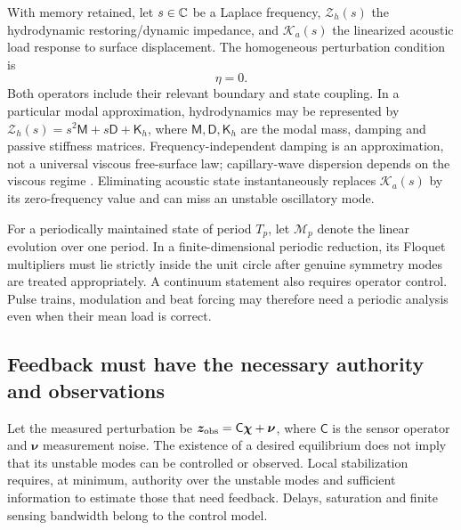 With memory retained, let $s\in\mathbb C$ be a Laplace frequency,
$\mathcal Z_h(s)$ the hydrodynamic restoring/dynamic impedance, and
$\mathcal K_a(s)$ the linearized acoustic load response to surface displacement.
The homogeneous perturbation condition is
\begin{equation}
 [\mathcal Z_h(s)-\mathcal K_a(s)]\eta=0.
 \label{eq:memory-stability}
\end{equation}
Both operators include their relevant boundary and state coupling. In a
particular modal approximation, hydrodynamics may be represented by
$\mathcal Z_h(s)=s^2\mathsf M+s\mathsf D+\mathsf K_h$, where
$\mathsf M,\mathsf D,\mathsf K_h$ are the modal mass, damping and passive
stiffness matrices. Frequency-independent damping is an approximation, not a
universal viscous free-surface law; capillary-wave dispersion depends on the
viscous regime \cite{denner2016}. Eliminating acoustic state instantaneously
replaces $\mathcal K_a(s)$ by its zero-frequency value and can miss an unstable
oscillatory mode.

For a periodically maintained state of period $T_p$, let $\mathcal M_p$ denote
the linear evolution over one period. In a finite-dimensional periodic
reduction, its Floquet multipliers must lie strictly inside the unit circle
after genuine symmetry modes are treated appropriately. A continuum statement
also requires operator control. Pulse trains, modulation and beat forcing may
therefore need a periodic analysis even when their mean load is correct.

\subsection{Feedback must have the necessary authority and observations}
Let the measured perturbation be
$\bm z_{\rm obs}=\mathsf C\bm\chi+\bm\nu$, where $\mathsf C$ is the sensor
operator and $\bm\nu$ measurement noise. The existence of a desired equilibrium
does not imply that its unstable modes can be controlled or observed. Local
stabilization requires, at minimum, authority over the unstable modes and
sufficient information to estimate those that need feedback. Delays, saturation
and finite sensing bandwidth belong to the control model.

